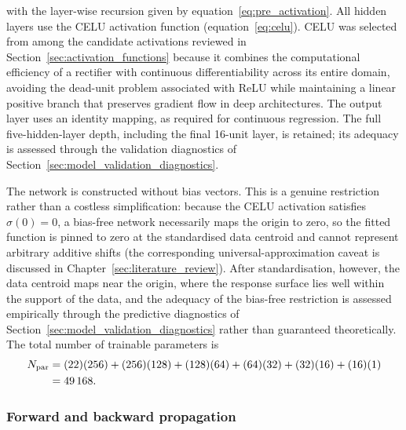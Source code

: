 with the layer-wise recursion given by
equation~\eqref{eq:pre_activation}.  All hidden layers use the
CELU activation function
(equation~\eqref{eq:celu}).  CELU was selected from among the
candidate activations reviewed in
Section~\ref{sec:activation_functions} because it combines the
computational efficiency of a rectifier with continuous
differentiability across its entire domain, avoiding the dead-unit
problem associated with ReLU while maintaining a linear positive
branch that preserves gradient flow in deep architectures.  The output
layer uses an identity mapping, as required for continuous regression.  The full five-hidden-layer depth,
including the final 16-unit layer, is retained; its adequacy is assessed
through the validation diagnostics of
Section~\ref{sec:model_validation_diagnostics}.

The network is constructed without bias vectors.  This is a genuine
restriction rather than a costless simplification: because the CELU
activation satisfies $\sigma(0)=0$, a bias-free network necessarily maps
the origin to zero, so the fitted function is pinned to zero at the
standardised data centroid and cannot represent arbitrary additive shifts
(the corresponding universal-approximation caveat is discussed in
Chapter~\ref{sec:literature_review}).  After standardisation, however, the
data centroid maps near the origin, where the response surface lies well
within the support of the data, and the adequacy of the bias-free
restriction is assessed empirically through the predictive diagnostics of
Section~\ref{sec:model_validation_diagnostics} rather than guaranteed
theoretically.  The total number of trainable parameters is
\begin{align}
    N_{\mathrm{par}}
    &= (22)(256) + (256)(128) + (128)(64) + (64)(32) + (32)(16) + (16)(1) \notag \\
    &= 49\,168.
    \label{eq:dnn_parameter_count_ch3}
\end{align}

\subsubsection{Forward and backward propagation}
\label{sec:propagation_mechanics}

